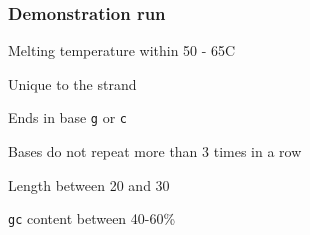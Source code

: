 \frame{\titlepage}
\begin{frame}
\frametitle{Demonstration run}
\item Melting temperature within 50 - 65\degree C
\item Unique to the strand
\item Ends in base \texttt{g} or \texttt{c}
\item Bases do not repeat more than 3 times in a row
\item Length between 20 and 30
\item \texttt{gc} content between 40-60\%
\end{frame}    

